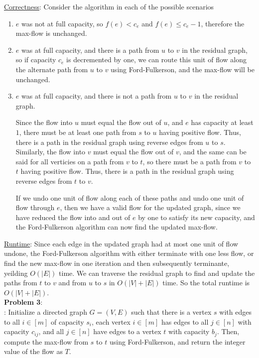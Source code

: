 \documentclass{article}
\begin{document}
\underline{Correctness}: Consider the algorithm in each of the possible scenarios
\begin{enumerate}
    \item $e$ was not at full capacity, so $f(e) < c_e$ and $f(e) \leq c_e - 1$, therefore the max-flow is unchanged.
    \item $e$ was at full capacity, and there is a path from $u$ to $v$ in the residual graph, so if capacity $c_e$ is decremented by one, we can route this unit of flow along the alternate path from $u$ to $v$ using Ford-Fulkerson, and the max-flow will be unchanged.
    \item $e$ was at full capacity, and there is not a path from $u$ to $v$ in the residual graph. 
    
    Since the flow into $u$ must equal the flow out of $u$, and $e$ has capacity at least $1$, there must be at least one path from $s$ to $u$ having positive flow. Thus, there is a path in the residual graph using reverse edges from $u$ to $s$. Similarly, the flow into $v$ must equal the flow out of $v$, and the same can be said for all verticies on a path from $v$ to $t$, so there must be a path from $v$ to $t$ having positive flow. Thus, there is a path in the residual graph using reverse edges from $t$ to $v$. 
    
    If we undo one unit of flow along each of these paths and undo one unit of flow through $e$, then we have a valid flow for the updated graph, since we have reduced the flow into and out of $e$ by one to satisfy its new capacity, and the Ford-Fulkerson algorithm can now find the updated max-flow.
\end{enumerate}
\underline{Runtime}: Since each edge in the updated graph had at most one unit of flow undone, the Ford-Fulkerson algorithm with either terminate with one less flow, or find the new max-flow in one iteration and then subsequently terminante, yeilding $O(|E|)$ time. We can traverse the residual graph to find and update the paths from $t$ to $v$ and from $u$ to $s$ in $O(|V| + |E|)$ time. So the total runtime is $O(|V| + |E|)$. \\[1.0ex]
\textbf{Problem 3}: \\[0.75ex]
: Initialize a directed graph $G = (V, E)$ such that there is a vertex $s$ with edges to all $i \in [m]$ of capacity $s_i$, each vertex $i \in [m]$ has edges to all $j \in [n]$ with capacity $c_{ij}$, and all $j \in [n]$ have edges to a vertex $t$ with capacity $b_j$. Then, compute the max-flow from $s$ to $t$ using Ford-Fulkerson, and return the integer value of the flow as $T$. \\[0.5ex]
\end{document}
